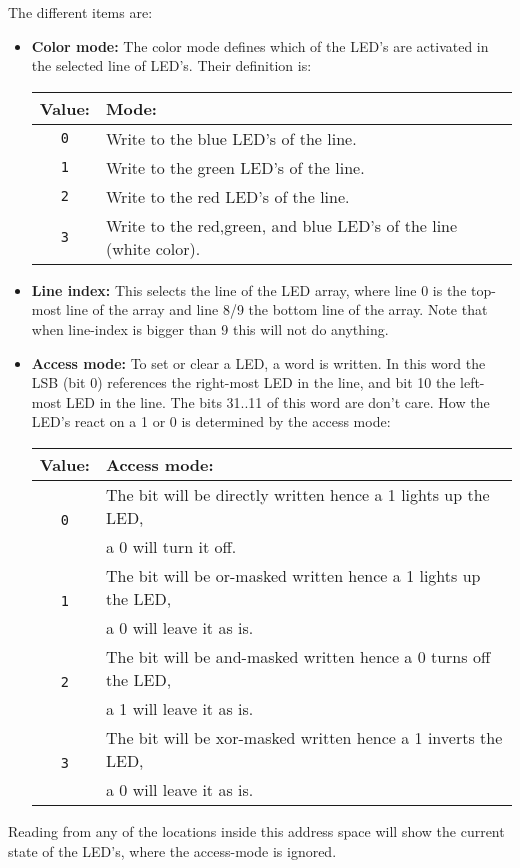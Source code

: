 \documentclass[a4paper,twoside,12pt]{article}
\begin{document}
The different items are:
\begin{itemize}
\item \textbf{Color mode:} The color mode defines which of the LED's are activated in the selected line of LED's. Their definition is:
\begin{center}
\begin{tabular}{|c|l|}
\hline
\textbf{Value:}&\textbf{Mode:}\\
\hline
\hline
\texttt{0}&Write to the blue LED's of the line.\\
\hline
\texttt{1}&Write to the green LED's of the line.\\
\hline
\texttt{2}&Write to the red LED's of the line.\\
\hline
\texttt{3}&Write to the red,green, and blue LED's of the line (white color).\\
\hline
\end{tabular}
\end{center}
\item \textbf{Line index:} This selects the line of the LED array, where line 0 is the top-most line of the array and line 8/9 the bottom line of the array. Note that when line-index is bigger than 9 this will not do anything.
\item \textbf{Access mode:} To set or clear a LED, a word is written. In this word the LSB (bit 0) references the right-most LED in the line, and bit 10 the left-most LED in the line. The bits 31..11 of this word are don't care. How the LED's react on a 1 or 0 is determined by the access mode:
\begin{center}
\begin{tabular}{|c|l|}
\hline
\textbf{Value:}&\textbf{Access mode:}\\
\hline
\hline
\multirow{2}{*}{\texttt{0}}&The bit will be directly written hence a 1 lights up the LED,\\
&a 0 will turn it off.\\
\hline
\multirow{2}{*}{\texttt{1}}&The bit will be or-masked written hence a 1 lights up the LED,\\
&a 0 will leave it as is.\\
\hline
\multirow{2}{*}{\texttt{2}}&The bit will be and-masked written hence a 0 turns off the LED,\\
&a 1 will leave it as is.\\
\hline
\multirow{2}{*}{\texttt{3}}&The bit will be xor-masked written hence a 1 inverts the LED,\\
& a 0 will leave it as is.\\
\hline
\end{tabular}
\end{center}
\end{itemize}
Reading from any of the locations inside this address space will show the current state of the LED's, where the access-mode is ignored.
\end{document}
